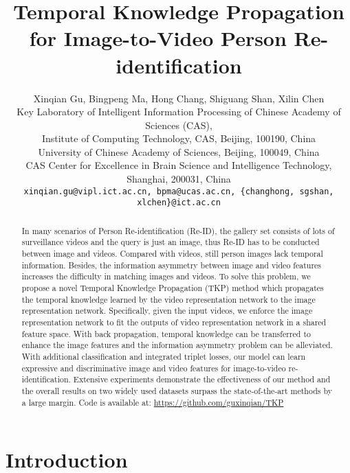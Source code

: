 \documentclass[10pt,twocolumn,letterpaper]{article}
\begin{document}
\title{Temporal Knowledge Propagation for Image-to-Video Person Re-identification}


\author{Xinqian Gu, Bingpeng Ma, Hong Chang, Shiguang Shan, Xilin Chen\\
Key Laboratory of Intelligent Information Processing of Chinese Academy of Sciences (CAS),\\Institute of Computing Technology, CAS, Beijing, 100190, China\\
University of Chinese Academy of Sciences, Beijing, 100049, China\\
CAS Center for Excellence in Brain Science and Intelligence Technology, Shanghai, 200031, China\\
{\tt\small xinqian.gu@vipl.ict.ac.cn, bpma@ucas.ac.cn, \{changhong, sgshan, xlchen\}@ict.ac.cn}
}

\maketitle
\ificcvfinal\thispagestyle{empty}\fi

\begin{abstract}
In many scenarios of Person Re-identification (Re-ID), the gallery set consists of lots of surveillance videos and the query is just an image, thus Re-ID has to be conducted between image and videos.
Compared with videos, still person images lack temporal information.
Besides, the information asymmetry between image and video features increases the difficulty in matching images and videos.
To solve this problem, we propose a novel Temporal Knowledge Propagation (TKP) method which propagates the temporal knowledge learned by the video representation network to the image representation network.
Specifically, given the input videos, we enforce the image representation network to fit the outputs of video representation network in a shared feature space.
With back propagation, temporal knowledge can be transferred to enhance the image features and the information asymmetry problem can be alleviated.
With additional classification and integrated triplet losses, our model can learn expressive and discriminative image and video features for image-to-video re-identification.
Extensive experiments demonstrate the effectiveness of our method and the overall results on two widely used datasets surpass the state-of-the-art methods by a large margin.
Code is available at: \url{https://github.com/guxinqian/TKP}
\end{abstract}

\section{Introduction}
\end{document}
